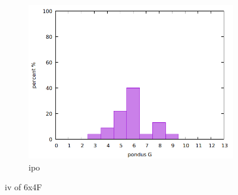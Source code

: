 \begin{figure}
\begin{subfigure}{.3\textwidth}
    \end{subfigure}
    \begin{subfigure}{.3\textwidth}
        \includegraphics[width=\textwidth]{Pics/iv/iv-192-ipo.png}
        \caption{ipo} \label{fig:ipo}
    \end{subfigure}
    \caption{iv of 6x4F} \label{fig:iv-ipo}
\end{figure}

